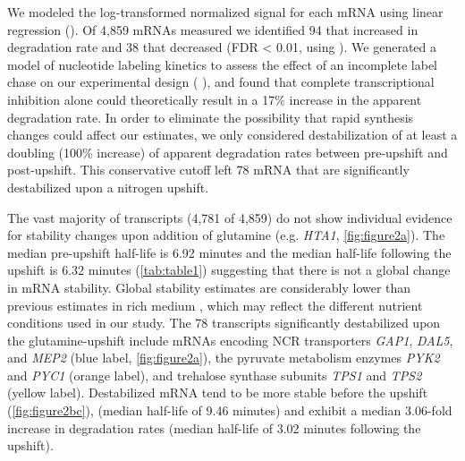 We modeled the
log-transformed normalized signal for each mRNA using linear
regression ().
Of 4,859 mRNAs measured we identified 94 that increased in 
degradation rate and 38 that decreased (FDR < 0.01, using
\cite{storey2003statistical}). 
We generated a model of nucleotide
labeling kinetics to assess the effect of an incomplete label 
chase on our experimental design (  ),
 and found that complete transcriptional inhibition alone could 
theoretically result in a 17\% increase in the apparent 
degradation rate. In order to eliminate the possibility that
rapid synthesis changes could affect our estimates,
we only considered destabilization of at least a
doubling (100\% increase) of apparent degradation rates between 
pre-upshift and post-upshift.
This conservative cutoff 
left 78 mRNA that are significantly destabilized 
upon a nitrogen upshift. 

The vast majority of transcripts (4,781 of 4,859) do not show
individual evidence for stability changes upon addition of glutamine
(e.g. \textit{HTA1}, \autoref{fig:figure2a}). 
The median pre-upshift half-life is 6.92 minutes and the median
half-life following the upshift is 6.32 minutes (\autoref{tab:table1})
suggesting that there is not a global change in mRNA stability.
Global stability estimates are
considerably lower than previous estimates in rich medium
\parencite{munchel2011dynamic,neymotin2014determination,miller2011dynamic}, 
which may reflect the
different nutrient conditions used in our study. 
The 78 transcripts significantly destabilized upon the 
glutamine-upshift include
mRNAs encoding NCR transporters \textit{GAP1}, \textit{DAL5}, and
\textit{MEP2} (blue label, \autoref{fig:figure2a}), the pyruvate metabolism enzymes
\textit{PYK2} and \textit{PYC1} (orange label), and trehalose synthase
subunits \textit{TPS1} and
\textit{TPS2} (yellow label).
Destabilized mRNA tend to be more stable before the upshift
(\autoref{fig:figure2bc}),
(median half-life of 9.46 minutes) and exhibit 
a median 3.06-fold increase in degradation rates (median half-life of
3.02 minutes following the upshift). 

\label{subsection:stabilityChanges}

\vspace{2em}

